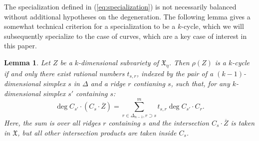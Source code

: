 \documentclass[11pt,reqno]{amsart}
\newtheorem{lem}[thm]{Lemma}
\theoremstyle{definition}
\newcommand{\X}{\mathfrak X}
\begin{document}
The specialization defined in (\ref{eq:specialization}) is not necessarily
balanced without additional hypotheses on the degeneration. The following lemma
gives a somewhat technical criterion for a specialization to be a $k$-cycle,
which we will subsequently specialize to the case of curves, which are a key
case of interest in this paper.

\begin{lem}\label{l:cycle-criterion}
Let $Z$ be a $k$-dimensional subvariety of $\X_\eta$. Then $\rho(Z)$ is a
$k$-cycle if and only there exist rational numbers $t_{s,r}$,  indexed by  the
pair of a $(k-1)$-dimensional simplex $s$ in $\Delta$ and a ridge $r$ contianing
$s$, such that, for any $k$-dimensional simplex $s'$ containing $s$:
\begin{equation*}
\deg C_{s'} \cdot (C_s \cdot \overline Z) =
\sum_{r \in \Delta_{n-1}, r \supset s}^m t_{s,r} \deg C_{s'} \cdot
C_{r}.
\end{equation*}
Here, the sum is over all ridges $r$ containing $s$ and the intersection $C_s
\cdot \overline Z$ is taken in $\X$, but all other intersection products are
taken inside $C_s$.
\end{lem}
\end{document}
